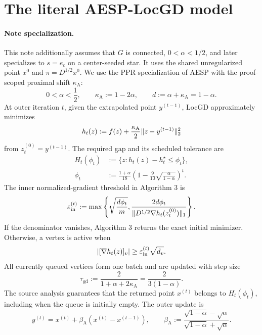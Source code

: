 \documentclass[11pt]{article}
\begin{document}
\section{The literal AESP-LocGD model}
\label{sec:model}



\paragraph{Note specialization.}
This note additionally assumes that \(G\) is connected,
\(0<\alpha<1/2\), and later specializes to \(s=e_c\) on a center-seeded
star. It uses the shared unregularized point \(x^0\) and
\(\pi=D^{1/2}x^0\). We use the PPR specialization of AESP with the
proof-scoped proximal shift \(\kappa_{\mathrm A}\):
\begin{equation}
  0<\alpha<\frac12,
  \qquad
  \kappa_{\mathrm A}:=1-2\alpha,
  \qquad
  d:=\alpha+\kappa_{\mathrm A}=1-\alpha.
  \label{eq:parameters}
\end{equation}
At outer iteration $t$, given the extrapolated point $y^{(t-1)}$, LocGD
approximately minimizes
\begin{equation}
  h_t(z):=f(z)+\frac{\kappa_{\mathrm A}}{2}\lVert z-y^{(t-1)}\rVert_2^2
  \label{eq:subproblem}
\end{equation}
from $z_t^{(0)}=y^{(t-1)}$.  The required gap and its scheduled tolerance are
\begin{align}
  H_t(\phi_t)
  &:=\{z:h_t(z)-h_t^\star\leq\phi_t\},
  \label{eq:Ht}\\
  \phi_t
  &:=\frac{1+\alpha}{18}
      \left(1-\frac9{10}\sqrt{\frac{\alpha}{1-\alpha}}\right)^t.
  \label{eq:phi}
\end{align}
The inner normalized-gradient threshold in Algorithm 3 is
\begin{equation}
  \varepsilon_{\mathrm{in}}^{(t)}
  :=\max\left\{
       \sqrt{\frac{d\phi_t}{m}},
       \frac{2d\phi_t}
       {\lVert D^{1/2}\nabla h_t(z_t^{(0)})\rVert_1}
     \right\}.
  \label{eq:inner-threshold}
\end{equation}
If the denominator vanishes, Algorithm 3 returns the exact initial minimizer.
Otherwise, a vertex is active when
\begin{equation}
  \left\lvert [\nabla h_t(z)]_v \right\rvert
  \geq \varepsilon_{\mathrm{in}}^{(t)}\sqrt{d_v}.
  \label{eq:activation}
\end{equation}
All currently queued vertices form one batch and are updated with step size
\begin{equation}
  \tau_{\mathrm{gd}}:=\frac{2}{1+\alpha+2\kappa_{\mathrm A}}
  =\frac{2}{3(1-\alpha)}.
  \label{eq:gd-step}
\end{equation}
The source analysis guarantees that the returned point $x^{(t)}$ belongs to
$H_t(\phi_t)$, including when the queue is initially empty.  The outer update
is
\begin{equation}
  y^{(t)}=x^{(t)}+\beta_{\mathrm A}(x^{(t)}-x^{(t-1)}),
  \qquad
  \beta_{\mathrm A}:=\frac{\sqrt{1-\alpha}-\sqrt\alpha}
               {\sqrt{1-\alpha}+\sqrt\alpha}.
  \label{eq:momentum}
\end{equation}
\end{document}
